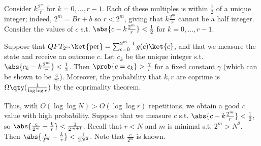 Consider $k\frac{2^m}{r}$ for $k = 0, \dots, r-1$.
Each of these multiples is within $\frac{1}{2}$ of a unique integer; indeed, $2^m = Br + b$ so $r < 2^m$, giving that $k\frac{2^m}{r}$ cannot be a half integer.
Consider the values of $c$ s.t. $\abs{c - k \frac{2^m}{r}} < \frac{1}{2}$ for $k = 0, \dots, r-1$.
\begin{theorem}
    Suppose that $QFT_{2^m} \ket{\mathrm{per}} = \sum_{c=0}^{2^m - 1} g(c) \ket{c}$, and that we measure the state and receive an outcome $c$.
    Let $c_k$ be the unique integer s.t. $\abs{c_k - k\frac{2^m}{r}} < \frac{1}{2}$.
    Then $\prob{c = c_k} > \frac{\gamma}{r}$ for a fixed constant $\gamma$ (which can be shown to be $\frac{4}{\pi^2}$).
    Moreover, the probability that $k, r$ are coprime is $\Omega\qty(\frac{1}{\log \log r})$ by the coprimality theorem.
\end{theorem}
Thus, with $O(\log \log N) > O(\log \log r)$ repetitions, we obtain a good $c$ value with high probability.
Suppose that we measure $c$ s.t. $\abs{c - k \frac{2^m}{r}} < \frac{1}{2}$, so $\abs{\frac{c}{2^m} - \frac{k}{r}} < \frac{1}{2^{m+1}}$.
Recall that $r < N$ and $m$ is minimal s.t. $2^m > N^2$.
Then $\abs{\frac{c}{2^m} - \frac{k}{r}} < \frac{1}{2N^2}$.
Note that $\frac{c}{2^m}$ is known.

